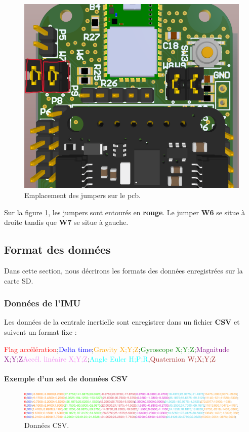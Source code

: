 \begin{figure}[h]
	\centering
	\includegraphics[width=0.4\linewidth]{../figures/code/config-mode-IMU}
	\caption{Emplacement des jumpers sur le \gls{pcb}.}
	\label{fig:config-mode-imu}
\end{figure}

Sur la figure \ref{fig:config-mode-imu}, les jumpers sont entourés en \textbf{rouge}. Le jumper \textbf{W6} se situe à droite tandis que \textbf{W7} se situe à gauche.

\clearpage	

\subsection{Format des données}

Dans cette section, nous décrirons les formats des données enregistrées sur la carte SD.

\subsubsection{Données de l'IMU} 
Les données de la centrale inertielle sont enregistrer dans un fichier \textbf{CSV} et suivent un format fixe :

\textcolor{red}{Flag accélération};\textcolor{blue}{Delta time};\textcolor{orange}{Gravity X;Y;Z};\textcolor{green}{Gyroscope X;Y;Z};\textcolor{purple}{Magnitude X;Y;Z}\textcolor{violet}{Accél. linéaire X;Y;Z};\textcolor{cyan}{Angle Euler H;P;R},\textcolor{brown}{Quaternion W;X;Y;Z}

\paragraph*{Exemple d'un set de données CSV}

\begin{figure}[h]
	\centering
	\includegraphics[width=1\linewidth]{../figures/code/donbnees-csv}
	\caption{Données CSV.}
	\label{fig:donbnees-csv}
\end{figure}

